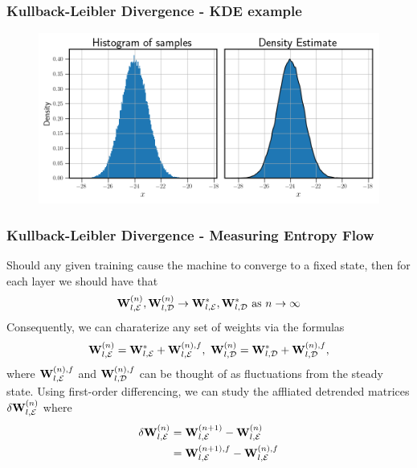 \documentclass[11pt,aspectratio=169]{beamer}
\begin{document}
    \begin{frame}
        \frametitle{Kullback-Leibler Divergence - KDE example}
        \begin{figure}
            \centering
            \includegraphics[width=\textwidth]{../Figures/kde_example.png}
        \end{figure}
    \end{frame}

    \begin{frame}
        \frametitle{Kullback-Leibler Divergence - Measuring Entropy Flow}
        Should any given training cause the machine to converge to a fixed state, then for each layer
        we should have that
        \begin{equation}
            {\bf W}_{l,\mathcal{E}}^{(n)}, {\bf W}_{l,\mathcal{D}}^{(n)} \to 
            {\bf W}_{l,\mathcal{E}}^{*}, {\bf W}_{l,\mathcal{D}}^{*} \text{ as }
            n \to \infty \label{eqn:weight convergence}
        \end{equation}
        Consequently, we can charaterize any set of weights via the formulas
        \begin{equation}
            {\bf W}_{l,\mathcal{E}}^{(n)} = {\bf W}_{l,\mathcal{E}}^{*} + {\bf W}_{l,\mathcal{E}}^{(n),f},\
            {\bf W}_{l,\mathcal{D}}^{(n)} = {\bf W}_{l,\mathcal{D}}^{*} + {\bf W}_{l,\mathcal{D}}^{(n),f},
        \end{equation}
        where ${\bf W}_{l,\mathcal{E}}^{(n),f}$ and 
        ${\bf W}_{l,\mathcal{D}}^{(n),f}$ can be thought of as fluctuations from the 
        steady state. Using first-order differencing, we can study the affliated 
        detrended matrices $\delta{\bf W}_{l,\mathcal{E}}^{(n)}$ where
        \begin{align*}
            \delta{\bf W}_{l,\mathcal{E}}^{(n)} &= {\bf W}_{l,\mathcal{E}}^{(n+1)} - {\bf W}_{l,\mathcal{E}}^{(n)} \\
            &= {\bf W}_{l,\mathcal{E}}^{(n+1),f} - {\bf W}_{l,\mathcal{E}}^{(n),f}
        \end{align*}
    \end{frame}
\end{document}
